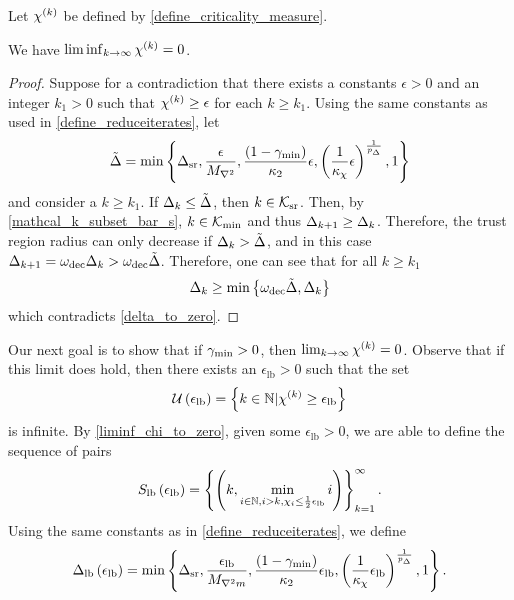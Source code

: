
\begin{lemma}
\label{liminf_chi_to_zero}
Let ${\chi^{(k)}}$ be defined by \cref{define_criticality_measure}.



We have $\liminf_{k\to\infty} {\chi^{(k)}} = 0$.
\end{lemma}
 

\begin{proof}
Suppose for a contradiction that there exists a constants $\epsilon > 0$ and an integer $k_1 > 0$ such that ${\chi^{(k)}} \ge \epsilon$ for each $k \ge k_1$.
Using the same constants as used in \cref{define_reduceiterates}, let
\begin{align*}
\tilde \Delta = \min \left\{
{\Delta_{\textrm{sr}}}, 
\frac{\epsilon}{{M_{\nabla^2}}}, 
\frac{(1 - \gamma_{\textrm{min}})}{{\kappa_2}} \epsilon,
\left(\frac 1 {\kappa_{\chi}} \epsilon \right)^{\frac 1 {p_{\Delta}}},
1\right\}
\end{align*}
and consider a $k \ge k_1$.
If $\Delta_k \le \tilde \Delta$, then $k \in {\mathcal K_{\textrm{sr}}}$.
Then, by \cref{mathcal_k_subset_bar_s},  $k \in {\mathcal K_{\textrm{min}}}$ and thus $\Delta_{k+1} \ge \Delta_k$.
Therefore, the trust region radius can only decrease if $\Delta_k > \tilde \Delta$, and in this case $\Delta_{k+1} = \omega_{\text{dec}}\Delta_k > \omega_{\text{dec}} \tilde \Delta$.
Therefore, one can see that for all $k \ge k_1$
\begin{align}
\Delta_k \ge \min\left\{\omega_{\text{dec}} \tilde \Delta, \Delta_k \right\}
\end{align}
which contradicts \cref{delta_to_zero}.
\end{proof}

Our next goal is to show that if $\gamma_{\textrm{min}} > 0$, then $\lim_{k\to\infty} {\chi^{(k)}} = 0$.
Observe that if this limit does hold, then there exists an $\epsilon_{\textrm{lb}} > 0$ such that the set
\begin{align}
{\mathcal U\left(\epsilon_{\textrm{lb}}\right)} = \left\{k \in \mathbb N | {\chi^{(k)}} \ge{\epsilon_{\textrm{lb}}} \right\} \label{define_the_finite_set}
\end{align}
is infinite.
By \cref{liminf_chi_to_zero}, given some $\epsilon_{\textrm{lb}} > 0$, we are able to define the sequence of pairs
\begin{align}
\label{define_slb}
{S_{\textrm{lb}}\left(\epsilon_{\textrm{lb}}\right)} = \left\{\left(k,
\min_{i \in \mathbb N, i > k, \chi_{i} \le \frac 1 2 {\epsilon_{\textrm{lb}}}} i
\right)\right\}_{k=1}^{\infty}.
\end{align}
Using the same constants as in \cref{define_reduceiterates}, we define
\begin{align}
{\Delta_{\textrm{lb}}\left(\epsilon_{\textrm{lb}}\right)} = \min\left\{
{\Delta_{\textrm{sr}}},
\frac{{\epsilon_{\textrm{lb}}}}{{M_{\nabla^2 m}}}, 
\frac{(1-\gamma_{\textrm{min}})}{{\kappa_2}}{\epsilon_{\textrm{lb}}}, 
\left(\frac 1 {\kappa_{\chi}} {\epsilon_{\textrm{lb}}} \right)^{\frac 1 {p_{\Delta}}}, 
1
\right\}. \label{define_delta_lb}
\end{align}


